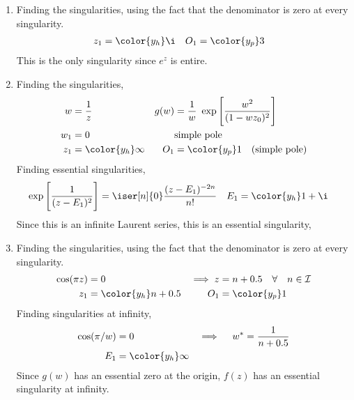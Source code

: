 \begin{enumerate}
    \item Finding the singularities, using the fact that the denominator is zero at
          every singularity.
          \begin{align}
              z_1 & = \color{y_h} \i & O_1 & = \color{y_p} 3
          \end{align}
          This is the only singularity since $ e^z $ is entire.

    \item Finding the singularities,
          \begin{align}
              w    & = \frac{1}{z}                                             &
              g(w) & = \frac{1}{w}\ \exp\Bigg[ \frac{w^2}{(1 - wz_0)^2} \Bigg]   \\
              w_1  & = 0                                                       &
                   & \text{simple pole}                                          \\
              z_1  & = \color{y_h} \infty                                      &
              O_1  & = \color{y_p} 1 \quad  \text{(simple pole)}
          \end{align}
          Finding essential singularities,
          \begin{align}
              \exp\Bigg[ \frac{1}{(z - E_1)^2} \Bigg] & = \iser[n]{0}
              \frac{(z - E_1)^{-2n}}{n!}              &
              E_1                                     & = \color{y_h} 1 + \i
          \end{align}
          Since this is an infinite Laurent series, this is an essential singularity,

    \item Finding the singularities, using the fact that the denominator is zero at
          every singularity.
          \begin{align}
              \cos(\pi z) & = 0                                             &
              \implies z  & = n + 0.5 \quad \forall \quad n \in \mathcal{I}   \\
              z_1         & = \color{y_h} n + 0.5                           &
              O_1         & = \color{y_p} 1
          \end{align}
          Finding singularities at infinity,
          \begin{align}
              \cos(\pi/w)        & = 0                  &
              \implies \quad w^* & =  \frac{1}{n + 0.5}   \\
              E_1                & = \color{y_h} \infty
          \end{align}
          Since $ g(w) $ has an essential zero at the origin,
          $ f(z) $ has an essential singularity at infinity.


\end{enumerate}
